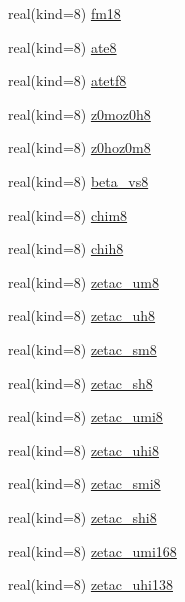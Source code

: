 \begin{DoxyCompactItemize}
\item 
real(kind=8) \hyperlink{namespacecanopy__air__coms_a544049d4f8f7a8a135df2f0d3105696a}{fm18}
\item 
real(kind=8) \hyperlink{namespacecanopy__air__coms_a896b380af341c4fda227104ec855c42f}{ate8}
\item 
real(kind=8) \hyperlink{namespacecanopy__air__coms_ac0a58110fa129fb929e126e046d2b6fd}{atetf8}
\item 
real(kind=8) \hyperlink{namespacecanopy__air__coms_afdd4c5b670411d96ba77803ed6e7820d}{z0moz0h8}
\item 
real(kind=8) \hyperlink{namespacecanopy__air__coms_ad12ca3c3ffdc40ca14f6a948d27d702a}{z0hoz0m8}
\item 
real(kind=8) \hyperlink{namespacecanopy__air__coms_aa2905dc30dae25c206e6b6a8c0b9fdf8}{beta\+\_\+vs8}
\item 
real(kind=8) \hyperlink{namespacecanopy__air__coms_a3f2a651b7e88c7013170fd87353d321a}{chim8}
\item 
real(kind=8) \hyperlink{namespacecanopy__air__coms_aa048cab087baff380bd240a8318ec8ea}{chih8}
\item 
real(kind=8) \hyperlink{namespacecanopy__air__coms_a0ca6faf34f131f616b83ef67fd4378f1}{zetac\+\_\+um8}
\item 
real(kind=8) \hyperlink{namespacecanopy__air__coms_adbe00f7d7b35e9b9c8fd089a3f43af6e}{zetac\+\_\+uh8}
\item 
real(kind=8) \hyperlink{namespacecanopy__air__coms_aa15239b3e11e62c0374d0baf2df69916}{zetac\+\_\+sm8}
\item 
real(kind=8) \hyperlink{namespacecanopy__air__coms_a7c5b672ade9a63cbf576713da8f3b93c}{zetac\+\_\+sh8}
\item 
real(kind=8) \hyperlink{namespacecanopy__air__coms_a0efff7cedb1c82920d87251dc41d2dbc}{zetac\+\_\+umi8}
\item 
real(kind=8) \hyperlink{namespacecanopy__air__coms_ade38033808e0a14fe6c57c6c0bca3830}{zetac\+\_\+uhi8}
\item 
real(kind=8) \hyperlink{namespacecanopy__air__coms_a926668c3d037ecfbb2d02ddb129f52b2}{zetac\+\_\+smi8}
\item 
real(kind=8) \hyperlink{namespacecanopy__air__coms_a0ae69e97c7743ff690c6554c17acb8ec}{zetac\+\_\+shi8}
\item 
real(kind=8) \hyperlink{namespacecanopy__air__coms_a9a1facba0961e590128989d12b63d4e9}{zetac\+\_\+umi168}
\item 
real(kind=8) \hyperlink{namespacecanopy__air__coms_ae957bcd38952302b378ebffb27d0172b}{zetac\+\_\+uhi138}

\end{DoxyCompactItemize}

